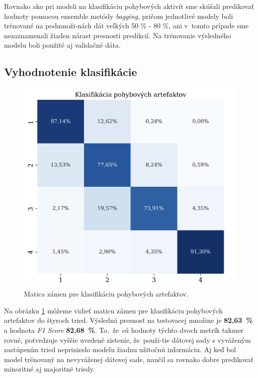 Rovnako ako pri modeli na klasifikáciu pohybových aktivít sme skúšali predikovať hodnoty pomocou ensemble metódy \textit{bagging}, pričom jednotlivé modely boli trénované na podmnoži-nách dát veľkých 50 \% - 80 \%, ani v~tomto prípade sme nezaznamenali žiaden nárast presnosti predikcií. Na trénovanie výsledného modelu boli použité aj validačné dáta.

\subsection{Vyhodnotenie klasifikácie}

\begin{figure}[H]
    \centering    
    \includegraphics[scale=0.07]{img/confusion_matrix_artefact.jpeg}
    \caption{Matica zámen pre klasifikáciu pohybových artefaktov.}
    \label{fig:artefact_classification}
\end{figure}

Na obrázku \ref{fig:artefact_classification} môžeme vidieť maticu zámen pre klasifikáciu pohybových artefaktov do štyroch tried. Výsledná presnosť na testovacej množine je \textbf{82,63~\%} a hodnota \textit{F1 Score} \textbf{82,68~\%}. To,~že~sú hodnoty týchto dvoch metrík takmer rovné, potvrdzuje vyššie uvedené zistenie, že~použi-tie dátovej sady s vyváženým zastúpením tried neprinieslo modelu žiadnu užitočnú informáciu. Aj keď bol model trénovaný na nevyváženej dátovej sade, naučil sa rovnako dobre predikovať minoritné aj majoritné triedy.

